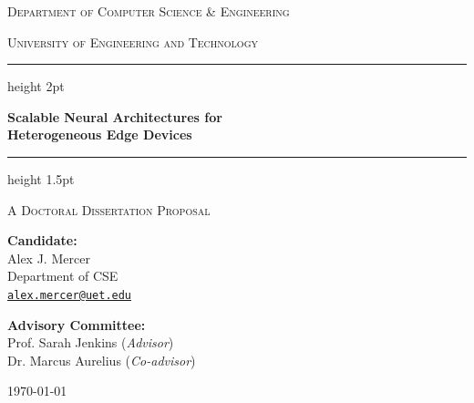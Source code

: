 \documentclass[11pt,a4paper]{article}
\begin{document}
\begin{titlepage}
    \centering
    \vspace*{1.0cm}
    
    {\scshape\large Department of Computer Science \& Engineering \par}
    {\scshape\normalsize University of Engineering and Technology \par}
    
    \vspace{2.2cm}
    
    {\color{accent}\hrule height 2pt}
    \vspace{0.4cm}
    {\Huge\bfseries\color{accent} Scalable Neural Architectures for\\ Heterogeneous Edge Devices\par}
    \vspace{0.4cm}
    {\color{accent}\hrule height 1.5pt}
    
    \vspace{1.5cm}
    
    {\large\scshape A Doctoral Dissertation Proposal\par}
    
    \vspace{2.2cm}
    
    \begin{minipage}[t]{0.45\textwidth}
        \flushleft
        \textbf{Candidate:}\\
        Alex J. Mercer\\
        Department of CSE\\
        \href{mailto:alex.mercer@uet.edu}{\texttt{alex.mercer@uet.edu}}
    \end{minipage}
    \hfill
    \begin{minipage}[t]{0.45\textwidth}
        \flushright
        \textbf{Advisory Committee:}\\
        Prof. Sarah Jenkins (\textit{Advisor})\\
        Dr. Marcus Aurelius (\textit{Co-advisor})
    \end{minipage}
    
    \vfill
    
    {\large \today \par}
    
    \vspace{1.0cm}
\end{titlepage}
\end{document}
